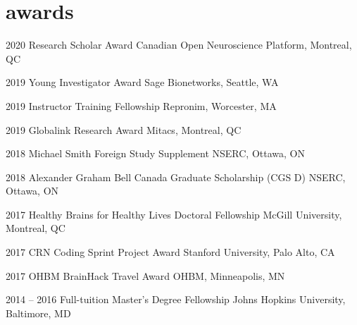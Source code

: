 \documentclass[]{friggeri-cv} %
\begin{document}
\section{awards}

\begin{entrylist}
\vspace{-7pt}

\entry
{2020}
{Research Scholar Award}
{Canadian Open Neuroscience Platform, Montreal, QC}
{}
\vspace{-7pt}

\entry
{2019}
{Young Investigator Award}
{Sage Bionetworks, Seattle, WA}
{}
\vspace{-7pt}

\entry
{2019}
{Instructor Training Fellowship}
{Repronim, Worcester, MA}
{}
\vspace{-7pt}

\entry
{2019}
{Globalink Research Award}
{Mitacs, Montreal, QC}
{}
\vspace{-7pt}

\entry
{2018}
{Michael Smith Foreign Study Supplement}
{NSERC, Ottawa, ON}
{}
\vspace{-7pt}

\entry
{2018}
{Alexander Graham Bell Canada Graduate Scholarship (CGS D)}
{NSERC, Ottawa, ON}
{}
\vspace{-7pt}


\entry
{2017}
{Healthy Brains for Healthy Lives Doctoral Fellowship}
{McGill University, Montreal, QC}
{}
\vspace{-7pt}

\entry
{2017}
{CRN Coding Sprint Project Award}
{Stanford University, Palo Alto, CA}
{}
\vspace{-7pt}

\entry
{2017}
{OHBM BrainHack Travel Award}
{OHBM, Minneapolis, MN}
{}
\vspace{-7pt}

\entry
{2014 -- 2016}
{Full-tuition Master's Degree Fellowship}
{Johns Hopkins University, Baltimore, MD}
{}
\vspace{-7pt}


\end{entrylist}
\end{document}

